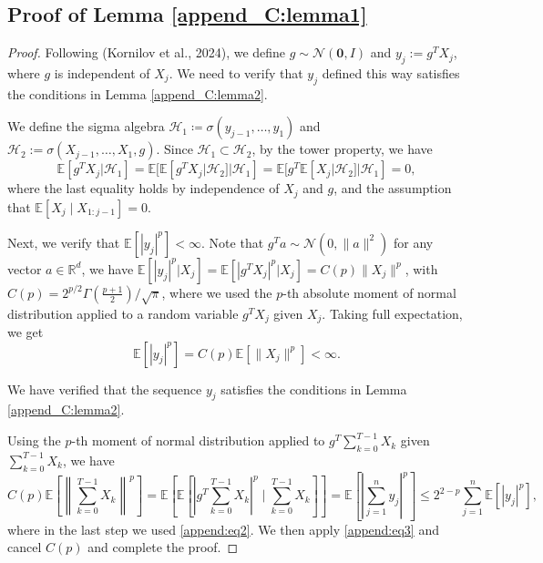 \documentclass{article}
\theoremstyle{plain}
\theoremstyle{definition}
\theoremstyle{remark}
\begin{document}
\subsection{Proof of Lemma \ref{append_C:lemma1}}
\begin{proof}
    Following (Kornilov et al., 2024), we define $g \sim \mathcal{N}(\boldsymbol{0}, I)$ and $y_j := g^T X_j$, where $g$ is independent of $X_j$. We need to verify that $y_j$ defined this way satisfies the conditions in Lemma \ref{append_C:lemma2}.
    
    We define the sigma algebra $\mathcal{H}_1 \coloneqq \sigma(y_{j-1}, \dots, y_1)$ and $\mathcal{H}_2 := \sigma(X_{j-1}, \dots, X_1, g)$. Since $\mathcal{H}_1 \subset \mathcal{H}_2$, by the tower property, we have
    \begin{equation*}
        \mathbb{E} [g^T X_j | \mathcal{H}_1] = \mathbb{E} [\mathbb{E} [g^T X_j | \mathcal{H}_2] | \mathcal{H}_1] = \mathbb{E} [g^T \mathbb{E} [X_j | \mathcal{H}_2] | \mathcal{H}_1] = 0,
    \end{equation*}
where the last equality holds by independence of $X_j$ and $g$, and the assumption that $\mathbb{E}[X_j \mid X_{1:j-1}] = 0$. 

Next, we verify that $\mathbb{E}[|y_j|^p] < \infty$. Note that $g^T a \sim \mathcal{N}(0, \|a\|^2)$ for any vector $a \in \mathbb{R}^d$, we have $\mathbb{E}[|y_j|^p | X_j] = \mathbb{E}[|g^T X_j|^p | X_j] = C(p) \|X_j\|^p$, with $C(p) = 2^{p/2} \Gamma(\frac{p+1}{2})/\sqrt{\pi}$, where we used the $p$-th absolute moment of normal distribution applied to a random variable $g^T X_j$ given $X_j$. Taking full expectation, we get
\begin{equation}\label{append:eq3}
\mathbb{E} [|y_j|^p] = C(p) \mathbb{E} [\|X_j\|^p] < \infty.
\end{equation}

We have verified that the sequence $y_j$ satisfies the conditions in Lemma \ref{append_C:lemma2}. 

Using the $p$-th moment of normal distribution applied to $g^T \sum_{k=0}^{T-1}X_k$ given $\sum_{k=0}^{T-1}X_k$, we have
\begin{equation*}
    C(p) \mathbb{E} \left[\left\|\sum_{k=0}^{T-1}X_k\right\|^p\right] = \mathbb{E} \left[\mathbb{E} \left[\left|g^T \sum_{k=0}^{T-1}X_k\right|^p \mid \sum_{k=0}^{T-1}X_k\right]\right] = \mathbb{E} \left[ \left| \sum_{j=1}^{n} y_j \right|^p \right] \le 2^{2-p} \sum_{j=1}^{n} \mathbb{E} [|y_j|^p],
\end{equation*}
where in the last step we used \eqref{append:eq2}. We then apply \eqref{append:eq3} and cancel $C(p)$ and complete the proof.
\end{proof}
\end{document}
